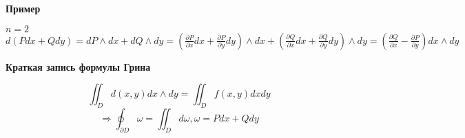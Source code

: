     \begin{center}
        \textbf{Пример}
    \end{center}
    $n=2$\\
    $d(Pdx + Qdy) = dP \wedge dx + dQ \wedge dy = (\frac{\partial P}{\partial x}dx + \frac{\partial P}{\partial y}dy) \wedge dx + (\frac{\partial Q}{\partial x}dx + \frac{\partial Q}{\partial y}dy) \wedge dy = (\frac{\partial Q}{\partial x} - \frac{\partial P}{\partial y})dx \wedge dy$\\
    
    \begin{center}
        \textbf{Краткая запись формулы Грина}
    \end{center}
    $$\iint_D d(x, y)dx \wedge dy = \iint_D f(x, y) dxdy$$
    $$\Rightarrow \oint_{\partial D} \omega = \iint_D d\omega, \omega = Pdx + Qdy$$